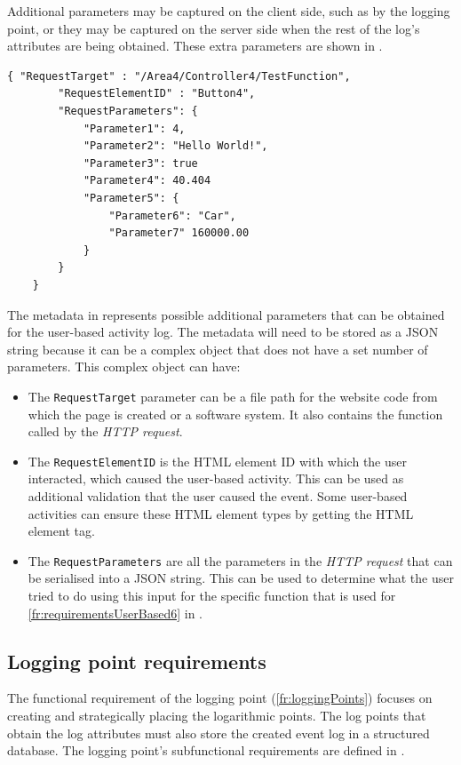 \clearpage

Additional parameters may be captured on the client side, such as by the logging point, or they may be captured on the server side when the rest of the log's attributes are being obtained. These extra parameters are shown in .

\begin{lstlisting}[style=json, caption={\textit{Metadata JSON}}, label={fig:ch2_MetadataJsonExample}] 
	{ "RequestTarget" : "/Area4/Controller4/TestFunction",
		"RequestElementID" : "Button4",
		"RequestParameters": {
			"Parameter1": 4,
			"Parameter2": "Hello World!",
			"Parameter3": true
			"Parameter4": 40.404
			"Parameter5": {
				"Parameter6": "Car",
				"Parameter7" 160000.00
			}
		}		
	}
\end{lstlisting}

The metadata in  represents possible additional parameters that can be obtained for the user-based activity log. The metadata will need to be stored as a JSON string because it can be a complex object that does not have a set number of parameters. This complex object can have:

\begin{itemize}
	\item The \texttt{RequestTarget} parameter can be a file path for the website code from which the page is created or a software system. It also contains the function called by the \textit{HTTP request}.
	\item The \texttt{RequestElementID} is the HTML element ID with which the user interacted, which caused the user-based activity. This can be used as additional validation that the user caused the event. Some user-based activities can ensure these HTML element types by getting the HTML element tag.
	\item The \texttt{RequestParameters} are all the parameters in the \textit{HTTP request} that can be serialised into a JSON string. This can be used to determine what the user tried to do using this input for the specific function that is used for \ref{fr:requirementsUserBased6} in .
\end{itemize}

\clearpage

\subsection{Logging point requirements}\label{sec:ch2_serverFunctionalRequirements}
The functional requirement of the logging point (\ref{fr:loggingPoints}) focuses on creating and strategically placing the logarithmic points. The log points that obtain the log attributes must also store the created event log in a structured database. The logging point's subfunctional requirements are defined in . 

